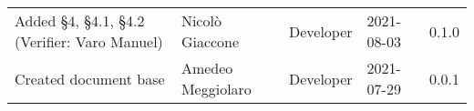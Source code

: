 \documentclass[a4paper]{article}
\begin{document}
\begin{center}
\begin{table}[h!]
\begin{tabular}{p{150px} p{90px} p{80px} p{60px} p{45px}}
            Added \S{4}, \S{4.1}, \S{4.2}  \newline(Verifier: Varo Manuel)                                                                                       & Nicolò Giaccone   & Developer     & 2021-08-03    & 0.1.0            \\
            Created document base                                                                                                                                & Amedeo Meggiolaro & Developer     & 2021-07-29    & 0.0.1            \\
        \end{tabular}
    \end{table}
\end{center}

\newpage
\tableofcontents
\newpage
\newpage
\listoffigures
\newpage







\end{document}
